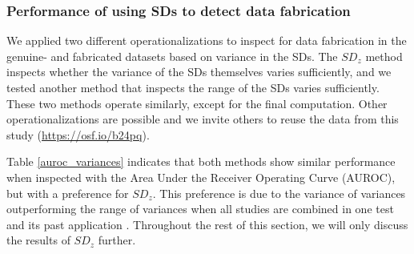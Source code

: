 \documentclass{article}
\begin{document}
\subsubsection*{Performance of using SDs to detect data fabrication}

We applied two different operationalizations to inspect for data fabrication in the genuine- and fabricated datasets based on variance in the SDs. The $SD_z$ method \citep{simonsohn2013} inspects whether the variance of the SDs themselves varies sufficiently, and we tested another method that inspects the range of the SDs varies sufficiently. These two methods operate similarly, except for the final computation. Other operationalizations are possible and we invite others to reuse the data from this study (\url{https://osf.io/b24pq}).

Table \ref{auroc_variances} indicates that both methods show similar performance when inspected with the Area Under the Receiver Operating Curve (AUROC), but with a preference for $SD_z$. This preference is due to the variance of variances outperforming the range of variances when all studies are combined in one test and its past application \citep{simonsohn2013}. Throughout the rest of this section, we will only discuss the results of $SD_z$ further.
\end{document}
